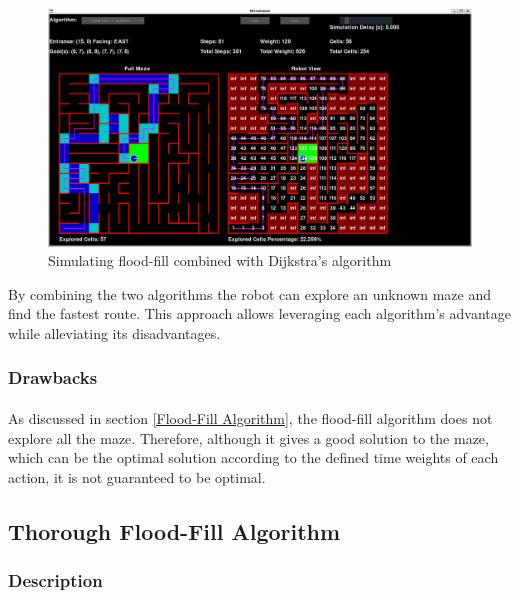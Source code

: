 \documentclass[12pt]{article}
\begin{document}
\begin{figure}[H]
\centering
\includegraphics[width=\textwidth]{images/floodijkstra.png}
\caption{Simulating flood-fill combined with Dijkstra's algorithm}
\label{Simulating flood-fill combined with Dijkstra's algorithm}
\end{figure}

By combining the two algorithms the robot can explore an unknown \gls{maze} and find the fastest route.
This approach allows leveraging each algorithm's advantage while alleviating its disadvantages.

\subsubsection{Drawbacks}
\paragraph{}
As discussed in section \ref{Flood-Fill Algorithm}, the flood-fill algorithm does not explore all the \gls{maze}.
Therefore, although it gives a good solution to the \gls{maze}, which can be the optimal solution according to the defined time weights of each action, it is not guaranteed to be optimal.

\subsection{Thorough Flood-Fill Algorithm} \label{thorough flood-fill algorithm}
\subsubsection{Description}
\end{document}
